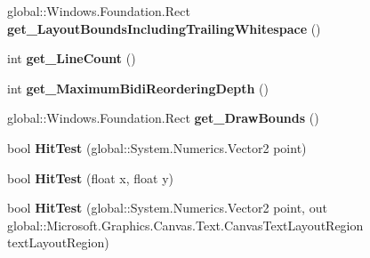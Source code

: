 \begin{DoxyCompactItemize}
global\+::\+Windows.\+Foundation.\+Rect {\bfseries get\+\_\+\+Layout\+Bounds\+Including\+Trailing\+Whitespace} ()
\item 
\mbox{\label{class_microsoft_1_1_graphics_1_1_canvas_1_1_text_1_1_canvas_text_layout_ada71c45dac02cdac6f56799104455aa5}} 
int {\bfseries get\+\_\+\+Line\+Count} ()
\item 
\mbox{\label{class_microsoft_1_1_graphics_1_1_canvas_1_1_text_1_1_canvas_text_layout_aac362a9384d9d8fa5cf235e2f129c939}} 
int {\bfseries get\+\_\+\+Maximum\+Bidi\+Reordering\+Depth} ()
\item 
\mbox{\label{class_microsoft_1_1_graphics_1_1_canvas_1_1_text_1_1_canvas_text_layout_a5230b0750a39afe10eab8898a0e65f82}} 
global\+::\+Windows.\+Foundation.\+Rect {\bfseries get\+\_\+\+Draw\+Bounds} ()
\item 
\mbox{\label{class_microsoft_1_1_graphics_1_1_canvas_1_1_text_1_1_canvas_text_layout_a096ba89ae4dafe4d7af99c68f87facb2}} 
bool {\bfseries Hit\+Test} (global\+::\+System.\+Numerics.\+Vector2 point)
\item 
\mbox{\label{class_microsoft_1_1_graphics_1_1_canvas_1_1_text_1_1_canvas_text_layout_abe577fdf1f6c6ac76801fb8eee342738}} 
bool {\bfseries Hit\+Test} (float x, float y)
\item 
\mbox{\label{class_microsoft_1_1_graphics_1_1_canvas_1_1_text_1_1_canvas_text_layout_acf6969a305076eb5ecd8ad98552ed8a5}} 
bool {\bfseries Hit\+Test} (global\+::\+System.\+Numerics.\+Vector2 point, out global\+::\+Microsoft.\+Graphics.\+Canvas.\+Text.\+Canvas\+Text\+Layout\+Region text\+Layout\+Region)
\item 
\mbox{\label{class_microsoft_1_1_graphics_1_1_canvas_1_1_text_1_1_canvas_text_layout_a39dc3babff6a75fb4e1468efdcf2ad6e}} 

\end{DoxyCompactItemize}
